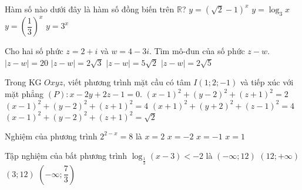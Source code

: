 \begin{ex}%
	Hàm số nào dưới đây là hàm số đồng biến trên $\mathbb{R}$?
	\choice
	{$y=\left( \sqrt{2}-1 \right)^x$}
	{$y=\log_3 x$}
	{$y=\left( \dfrac{1}{3} \right)^x$}
	{\True $y=3^x$}
\end{ex}
\begin{ex}%
	Cho hai số phức $z=2+i$ và $w=4-3i$. Tìm mô-đun của số phức $z-w$.
	\choice
	{$\left| z-w \right|=20$}
	{$\left| z-w \right|=2\sqrt{3}$}
	{$\left| z-w \right|=5\sqrt{2}$}
	{\True $\left| z-w \right|=2\sqrt{5}$}
\end{ex}
\begin{ex}%
	Trong KG $Oxyz$, viết phương trình mặt cầu có tâm $ I\left(1;2;-1\right)$ và tiếp xúc với
	mặt phẳng $(P)\colon x-2y+2z-1=0$.
	\choice
	{$\left(x-1\right)^2+\left(y-2\right)^2+\left(z+1\right)^2=2$}
	{\True $\left(x-1\right)^2+\left(y-2\right)^2+\left(z+1\right)^2=4$}
	{$\left(x+1\right)^2+\left(y+2\right)^2+\left(z-1\right)^2=4$}
	{$\left(x-1\right)^2+\left(y-2\right)^2+\left(z+1\right)^2=\sqrt{2}$}
\end{ex}
\begin{ex}%
	Nghiệm của phương trình $2^{2-x}=8$ là 
	\choice
	{$ x=2$}
	{$ x=-2$}
	{\True $ x=-1$}
	{$ x=1$}
\end{ex}
\begin{ex}%
	Tập nghiệm của bất phương trình $\log_{\tfrac{1}{3}}\left(x-3\right)<-2$ là
	\choice
	{$\left(-\infty;12\right)$}
	{\True $\left(12;+\infty\right)$}
	{$\left(3;12\right)$}
	{$\left(-\infty;\dfrac{7}{3}\right)$}
\end{ex}

